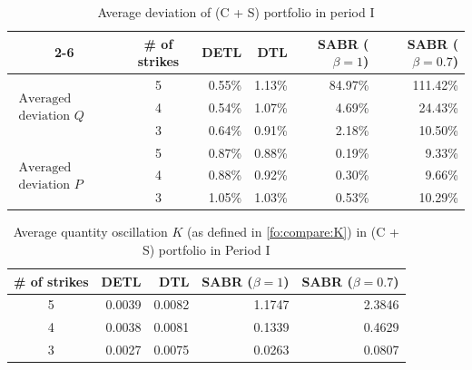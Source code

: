 \documentclass{article}
\numberwithin{equation}{section}
\begin{document}
\begin{table}[hb]
\centering
 \caption{Average deviation of (C + S) portfolio in period I}\label{tb:compare:pA1}
\begin{tabular}{|c|c|r|r|r|r|} 
\cline{2-6}
\multicolumn{1}{r|}{}&  \# of strikes & DETL &  DTL & SABR ($\beta = 1$) & SABR ($\beta = 0.7$) \\ 
\hline \hline
\multirow{3}{*}{$\begin{array}{c}  \text{Averaged realized}\\\text{deviation } Q  \end{array}$} &  5 & 0.55\% & 1.13\% & 84.97\% & 111.42\%\\ \cline{2-6}
& 4 & 0.54\% & 1.07\% & 4.69\% & 24.43\%\\ \cline{2-6}
& 3 & 0.64\% & 0.91\% & 2.18\% & 10.50\%\\
\hline \hline
\multirow{3}{*}{$\begin{array}{c}  \text{Averaged predicted}\\\text{deviation } P \end{array}$}  &  5 & 0.87\% & 0.88\% & 0.19\% & 9.33\% \\ \cline{2-6}
& 4 & 0.88\% & 0.92\% & 0.30\% & 9.66\%\\ \cline{2-6}
& 3 & 1.05\% & 1.03\%& 0.53\% & 10.29\% \\ 
\hline
\end{tabular}
\end{table}

\begin{table}[hb]
\centering
 \caption{Average quantity oscillation $K$ (as defined in \eqref{fo:compare:K}) in (C + S) portfolio in Period I}\label{tb:compare:qA1}
\begin{tabular}{|c|r|r|r|r|} 
\hline
\# of strikes & DETL &  DTL & SABR ($\beta = 1$) & SABR ($\beta = 0.7$) \\ \hline
5 & 0.0039 & 0.0082 & 1.1747 & 2.3846 \\ \hline
4 & 0.0038 & 0.0081 & 0.1339 & 0.4629 \\ \hline
3 & 0.0027 & 0.0075 & 0.0263 & 0.0807 \\ 
\hline
\end{tabular}
\end{table}
\end{document}
